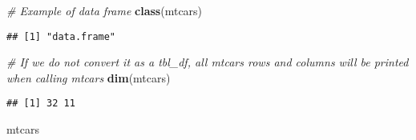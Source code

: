 \documentclass[]{book}
\newenvironment{Shaded}{\begin{snugshade}}{\end{snugshade}}
\newcommand{\KeywordTok}[1]{\textcolor[rgb]{0.13,0.29,0.53}{\textbf{{#1}}}}
\newcommand{\CommentTok}[1]{\textcolor[rgb]{0.56,0.35,0.01}{\textit{{#1}}}}
\newcommand{\NormalTok}[1]{{#1}}
\begin{document}
\begin{Shaded}
\begin{Highlighting}[]
\CommentTok{# Example of data frame}
\KeywordTok{class}\NormalTok{(mtcars)}
\end{Highlighting}
\end{Shaded}

\begin{verbatim}
## [1] "data.frame"
\end{verbatim}

\begin{Shaded}
\begin{Highlighting}[]
\CommentTok{# If we do not convert it as a tbl_df, all mtcars rows and columns will be printed when calling mtcars }
\KeywordTok{dim}\NormalTok{(mtcars)}
\end{Highlighting}
\end{Shaded}

\begin{verbatim}
## [1] 32 11
\end{verbatim}

\begin{Shaded}
\begin{Highlighting}[]
\NormalTok{mtcars}
\end{Highlighting}
\end{Shaded}
\end{document}
